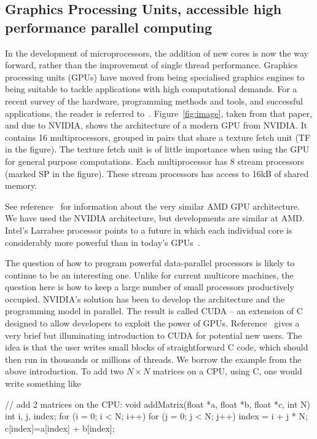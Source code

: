\subsection{Graphics Processing Units, accessible high performance parallel computing}
\label{sec:gpu}

In the development of microprocessors, the addition of new cores is now the
way forward, rather than the improvement of single thread performance.
Graphics processing units (GPUs) have moved from being specialised graphics
engines to being suitable to tackle applications with high computational
demands. For a recent survey of the hardware, programming methods and tools,
and successful applications, the reader is referred to~.
Figure~\ref{fig:image}, taken from that paper, and due to NVIDIA, shows the
architecture of a modern GPU from NVIDIA. It contains 16 multiprocessors, 
grouped in pairs that share a texture fetch unit (TF in the figure). The 
texture fetch unit is of little importance when using the GPU for general 
purpose computations. Each multiprocessor has 8 stream processors (marked 
SP in the figure). These stream processors has access to 16kB of shared memory.  

See reference~ for information about
the very similar AMD GPU architecture. We have used the NVIDIA architecture,
but developments are similar at AMD. Intel's Larrabee processor points to a
future in which each individual core is considerably more powerful than in
today's GPUs~.


The question of how to program powerful data-parallel processors is likely
to continue to be an interesting one. Unlike for current multicore machines,
the question here is how to keep a large number of small processors
productively occupied. NVIDIA's solution has been to develop the
architecture and the programming model in parallel. The result is called
CUDA -- an extension of C designed to allow developers to exploit the power
of GPUs. Reference~ gives a very brief but illuminating
introduction to CUDA for potential new users. The idea is that the user
writes small blocks of straightforward C code, which should then run in
thousands or millions of threads. We borrow the example from the above
introduction. To add two $N \times N$ matrices on a CPU, using C, one would
write something like

\begin{code}
// add 2 matrices on the CPU:
void addMatrix(float *a, float *b, float *c, int N)
{
  int i, j, index;
  for (i = 0; i < N; i++) {
    for (j = 0; j < N; j++) {
      index = i + j * N;
      c[index]=a[index] + b[index];
    }
  }
}
\end{code}
\FloatBarrier

